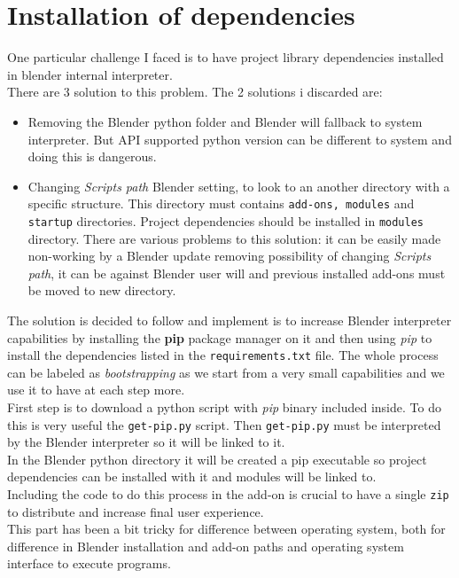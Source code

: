 \section{Installation of dependencies}
One particular challenge I faced is to have project library dependencies installed in blender internal interpreter. \\
There are 3 solution to this problem. The 2 solutions i discarded are: 
\begin{itemize}
\item Removing the Blender python folder and Blender will fallback to system interpreter. But API supported python version can be different to system and doing this is dangerous.
\item Changing \textit{Scripts path} Blender setting, to look to an another directory with a specific structure. This directory must contains \texttt{add-ons, modules} and \texttt{startup} directories. Project dependencies should be installed in \texttt{modules} directory. There are various problems to this solution: it can be easily made non-working by a Blender update removing possibility of changing \textit{Scripts path}, it can be against Blender user will and previous installed add-ons must be moved to new directory.
\end{itemize}
The solution is decided to follow and implement is to increase Blender interpreter capabilities by installing the \textbf{pip} package manager on it and then using \textit{pip} to install the dependencies listed in the \texttt{requirements.txt} file. The whole process can be labeled as \textit{bootstrapping} as we start from a very small capabilities and we use it to have at each step more. \\
First step is to download a python script with \textit{pip} binary included inside. To do this is very useful the \texttt{get-pip.py} script. \cite{}
Then \texttt{get-pip.py} must be interpreted by the Blender interpreter so it will be linked to it.  \\
In the Blender python directory it will be created a pip executable so project dependencies can be installed with it and modules will be linked to. \\
Including the code to do this process in the add-on is crucial to have a single \texttt{zip} to distribute and increase final user experience. \\
This part has been a bit tricky for difference between operating system, both for difference in Blender installation and add-on paths and operating system interface to execute programs. \\